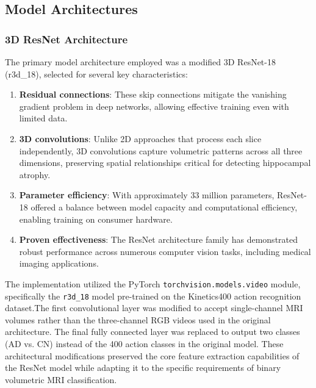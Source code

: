 \documentclass[12pt, a4paper]{article}
\begin{document}
\subsection{Model Architectures}
\subsubsection{3D ResNet Architecture}

The primary model architecture employed was a modified 3D ResNet-18 (r3d\_18), selected for several key characteristics:

\begin{enumerate}
    \item \textbf{Residual connections}: These skip connections mitigate the vanishing gradient problem in deep networks, allowing effective training even with limited data.
    
    \item \textbf{3D convolutions}: Unlike 2D approaches that process each slice independently, 3D convolutions capture volumetric patterns across all three dimensions, preserving spatial relationships critical for detecting hippocampal atrophy.
    
    \item \textbf{Parameter efficiency}: With approximately 33 million parameters, ResNet-18 offered a balance between model capacity and computational efficiency, enabling training on consumer hardware.
    
    \item \textbf{Proven effectiveness}: The ResNet architecture family has demonstrated robust performance across numerous computer vision tasks, including medical imaging applications.
\end{enumerate}


The implementation utilized the PyTorch \texttt{torchvision.models.video} module, specifically the \texttt{r3d\_18} model pre-trained on the Kinetics400 action recognition dataset.The first convolutional layer was modified to accept single-channel MRI volumes rather than the three-channel RGB videos used in the original architecture. The final fully connected layer was replaced to output two classes (AD vs. CN) instead of the 400 action classes in the original model. These architectural modifications preserved the core feature extraction capabilities of the ResNet model while adapting it to the specific requirements of binary volumetric MRI classification.
\end{document}
